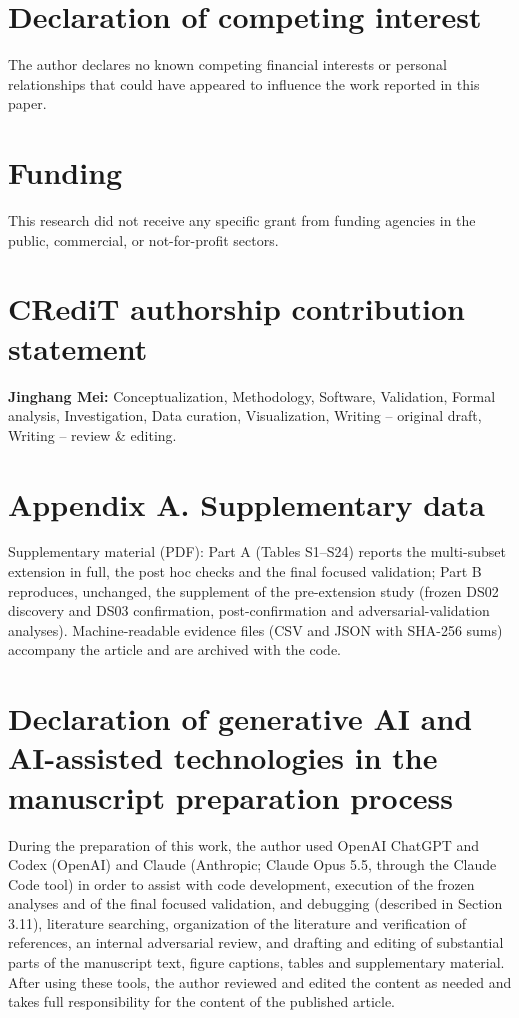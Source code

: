 \documentclass[preprint,11pt,a4paper]{elsarticle}
\begin{document}
\section*{Declaration of competing interest}

The author declares no known competing financial interests or personal relationships that could have appeared to influence the work reported in this paper.

\section*{Funding}

This research did not receive any specific grant from funding agencies in the public, commercial, or not-for-profit sectors.

\section*{CRediT authorship contribution statement}

\textbf{Jinghang Mei:} Conceptualization, Methodology, Software, Validation, Formal analysis, Investigation, Data curation, Visualization, Writing – original draft, Writing – review \& editing.

\section*{Appendix A. Supplementary data}

Supplementary material (PDF): Part A (Tables S1–S24) reports the multi-subset extension in full, the post hoc checks and the final focused validation; Part B reproduces, unchanged, the supplement of the pre-extension study (frozen DS02 discovery and DS03 confirmation, post-confirmation and adversarial-validation analyses). Machine-readable evidence files (CSV and JSON with SHA-256 sums) accompany the article and are archived with the code.

\section*{Declaration of generative AI and AI-assisted technologies in the manuscript preparation process}

During the preparation of this work, the author used OpenAI ChatGPT and Codex (OpenAI) and Claude (Anthropic; Claude Opus 5.5, through the Claude Code tool) in order to assist with code development, execution of the frozen analyses and of the final focused validation, and debugging (described in Section 3.11), literature searching, organization of the literature and verification of references, an internal adversarial review, and drafting and editing of substantial parts of the manuscript text, figure captions, tables and supplementary material. After using these tools, the author reviewed and edited the content as needed and takes full responsibility for the content of the published article.




\end{document}
